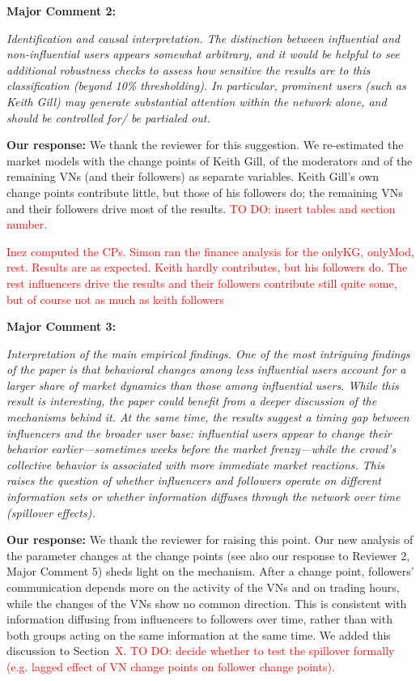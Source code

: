 \documentclass[11pt]{article}
\newcommand{\reviewercomment}[1]{\begin{commentbox}\textit{#1}\end{commentbox}}
\newcommand{\ourresponse}[1]{\textbf{Our response:} #1}
\begin{document}
\bigskip

\textbf{Major Comment 2:}

\reviewercomment{%
\textit{Identification and causal interpretation.} The distinction between influential and non-influential users appears somewhat arbitrary, and it would be helpful to see additional robustness checks to assess how sensitive the results are to this classification (beyond 10\% thresholding). In particular, prominent users (such as Keith Gill) may generate substantial attention within the network alone, and should be controlled for/ be partialed out. 
}

\ourresponse{
We thank the reviewer for this suggestion. We re-estimated the market models with the change points of Keith Gill, of the moderators and of the remaining VNs (and their followers) as separate variables. Keith Gill's own change points contribute little, but those of his followers do; the remaining VNs and their followers drive most of the results. \textcolor{red}{TO DO: insert tables and section number.}

\textcolor{red}{Inez computed the CPs. Simon ran the finance analysis for the onlyKG, onlyMod, rest. Results are as expected. Keith hardly contributes, but his followers do. The rest influencers drive the results and their followers contribute still quite some, but of course not as much as keith followers}
}

\bigskip

\textbf{Major Comment 3:}

\reviewercomment{%
	\textit{Interpretation of the main empirical findings.} One of the most intriguing findings of the paper is that behavioral changes among less influential users account for a larger share of market dynamics than those among influential users. While this result is interesting, the paper could benefit from a deeper discussion of the mechanisms behind it. At the same time, the results suggest a timing gap between influencers and the broader user base: influential users appear to change their behavior earlier—sometimes weeks before the market frenzy—while the crowd’s collective behavior is associated with more immediate market reactions. This raises the question of whether influencers and followers operate on diﬀerent information sets or whether information diﬀuses through the network over time (spillover eﬀects).
}

\ourresponse{
	We thank the reviewer for raising this point. Our new analysis of the parameter changes at the change points (see also our response to Reviewer 2, Major Comment 5) sheds light on the mechanism. After a change point, followers' communication depends more on the activity of the VNs and on trading hours, while the changes of the VNs show no common direction. This is consistent with information diffusing from influencers to followers over time, rather than with both groups acting on the same information at the same time. We added this discussion to Section~\textcolor{red}{X}.
	\textcolor{red}{TO DO: decide whether to test the spillover formally (e.g. lagged effect of VN change points on follower change points).}
}
\end{document}
